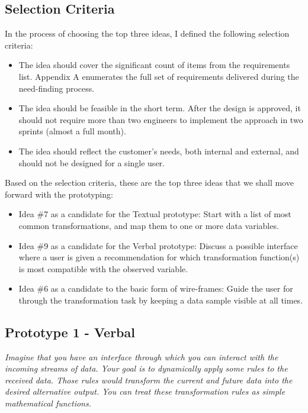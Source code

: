 \documentclass[12pt,letterpaper]{article}
\begin{document}
\subsection*{Selection Criteria}
In the process of choosing the top three ideas, I defined the following selection criteria:

\begin{itemize}
    \item The idea should cover the significant count of items from the requirements list. Appendix A enumerates the full set of requirements delivered during the need-finding process.
    \item The idea should be feasible in the short term. After the design is approved, it should not require more than two engineers to implement the approach in two sprints (almost a full month).
    \item The idea should reflect the customer's needs, both internal and external, and should not be designed for a single user. 
\end{itemize}

Based on the selection criteria, these are the top three ideas that we shall move forward with the prototyping:

\begin{itemize}
    \item Idea \#7 as a candidate for the Textual prototype: Start with a list of most common transformations, and map them to one or more data variables.
    \item Idea \#9 as a candidate for the Verbal prototype: Discuss a possible interface where a user is given a recommendation for which transformation function(s) is most compatible with the observed variable.
    \item Idea \#6 as a candidate to the basic form of wire-frames: Guide the user for through the transformation task by keeping a data sample visible at all times.  
\end{itemize}


\subsection*{Prototype 1 - Verbal}

\textit{Imagine that you have an interface through which you can interact with the incoming streams of data. Your goal is to dynamically apply some rules to the received  data. Those rules would transform the current and future data into the desired alternative output. You can treat these transformation rules as simple mathematical functions.}
\end{document}
